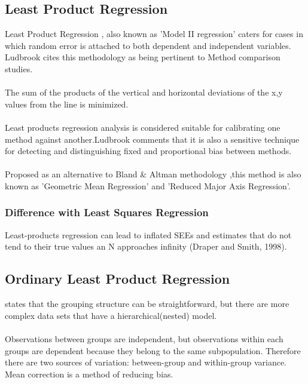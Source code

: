 \documentclass[12pt, a4paper]{report}
\begin{document}
\subsection{Least Product Regression}
Least Product Regression , also known as 'Model II regression'
caters for cases in which random error is attached to both
dependent and independent variables. Ludbrook cites this
methodology as being pertinent to Method comparison studies.
\\
\\
The sum of the products of the vertical and horizontal deviations
of the x,y values from the line is minimized.
\\
\\
Least products regression analysis is considered suitable for
calibrating one method against another.Ludbrook comments that it
is also a sensitive technique for detecting and distinguishing
fixed and proportional bias between methods.
\\
\\
Proposed as an alternative to Bland \& Altman methodology ,this
method is also known as 'Geometric Mean Regression' and 'Reduced
Major Axis Regression'.

\subsubsection{Difference with Least Squares Regression}
Least-products regression can lead to inflated SEEs and estimates
that do not tend to their true values an N approaches infinity
(Draper and Smith, 1998).



\subsection{Ordinary Least Product Regression}
\citet{ludbrook97} states that the grouping structure can be
straightforward, but there are more complex data sets that have a
hierarchical(nested) model.
\\
\\
Observations between groups are independent, but observations
within each groups are dependent because they belong to the same
subpopulation. Therefore there are two sources of variation:
between-group and within-group variance.
 \vspace{5 mm} \noindent Mean correction is a method of reducing
bias.
\end{document}
